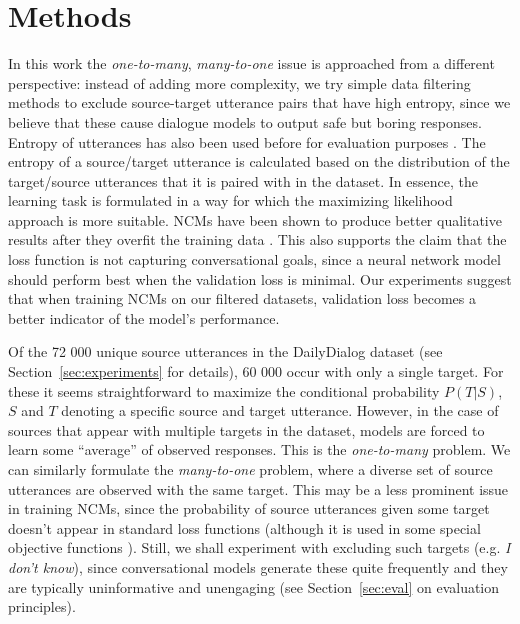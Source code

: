 \documentclass[11pt,a4paper]{article}
\begin{document}
\section{Methods}
\label{sec:methods}

In this work the \textit{one-to-many}, \textit{many-to-one} issue is
approached from a different perspective: instead of adding more complexity, we
try simple data filtering methods to exclude source-target utterance pairs
that have high entropy, since we believe that these cause dialogue models to
output safe but boring responses. Entropy of utterances has also been used before for evaluation purposes \cite{Serban:2017b}. The entropy of a source/target utterance is
calculated based on the distribution of the target/source utterances that it
is paired with in the dataset. In essence, the learning task is formulated in
a way for which the maximizing likelihood approach is more suitable.
NCMs have been shown to produce better qualitative results after they overfit
the training data
\cite{Csaky:2017,Tandon:2017}. This also supports the claim that the loss
function is not capturing conversational goals, since a neural network model
should perform best when the validation loss is minimal. Our experiments
suggest that when training NCMs on our filtered datasets, validation loss
becomes a better indicator of the model's performance.

Of the 72 000 unique source utterances in the
DailyDialog dataset (see Section~\ref{sec:experiments} for details),
60 000 occur with only a single target. For these it seems
straightforward to maximize the conditional probability $P(T|S)$, $S$ and $T$ denoting
a specific source and target utterance.
However, in the case of sources that appear with multiple targets in the dataset,
models are forced to learn some ``average'' of
observed responses. This is the \textit{one-to-many} problem.
We can similarly formulate the \textit{many-to-one}
problem, where a diverse set of source utterances are observed with the
same target. This may be a less prominent issue in training NCMs,
since the probability of source utterances given some target
doesn't appear in standard loss functions (although it is used
in some special objective functions \cite{Li:2015c}). Still, we shall
experiment with excluding such targets (e.g. \textit{I don't know}),
since conversational models generate these quite frequently and they are
typically uninformative and unengaging (see Section~\ref{sec:eval} on
evaluation principles).
\end{document}
